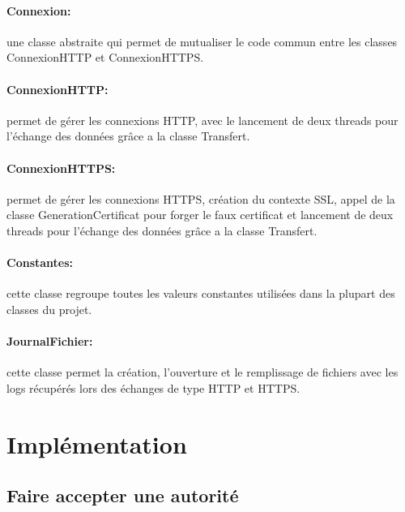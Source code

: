 \documentclass[a4paper,11pt,french]{report}
\begin{document}
	\paragraph{Connexion:} une classe abstraite qui permet de mutualiser le code commun
	entre les classes ConnexionHTTP et ConnexionHTTPS.
	\paragraph{ConnexionHTTP:} permet de gérer les connexions HTTP, avec le lancement
	de deux threads pour l'échange des données grâce a la classe Transfert.
	\paragraph{ConnexionHTTPS:} permet de gérer les connexions HTTPS, création du contexte SSL, appel de la classe
	GenerationCertificat pour forger le faux certificat et lancement de deux threads pour l'échange des données grâce a la classe Transfert.
	\paragraph{Constantes:} cette classe regroupe toutes les valeurs constantes
	utilisées dans la plupart des classes du projet.
	\paragraph{JournalFichier:} cette classe permet la création, l'ouverture et le remplissage
	de fichiers avec les logs récupérés lors des échanges de type HTTP et HTTPS.
~~\\





\section{Implémentation}
\subsection{Faire accepter une autorité}

\end{document}
